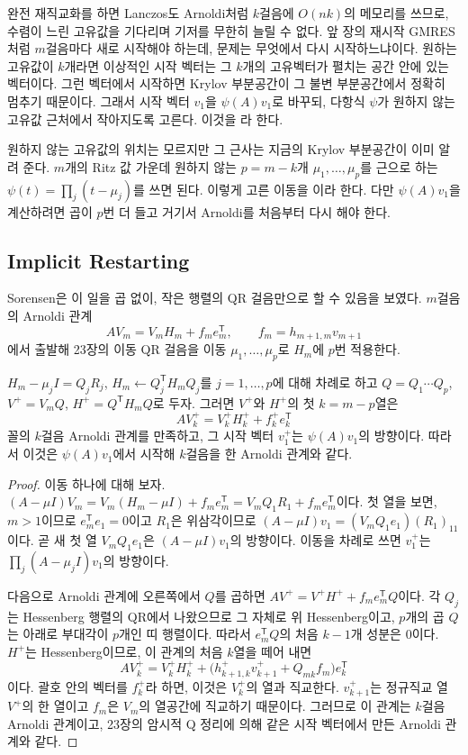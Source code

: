 완전 재직교화를 하면 Lanczos도 Arnoldi처럼 $k$걸음에 $O(nk)$의 메모리를 쓰므로, 수렴이 느린 고유값을 기다리며 기저를 무한히 늘릴 수 없다. 앞 장의 재시작 GMRES처럼 $m$걸음마다 새로 시작해야 하는데, 문제는 무엇에서 다시 시작하느냐이다. 원하는 고유값이 $k$개라면 이상적인 시작 벡터는 그 $k$개의 고유벡터가 펼치는 공간 안에 있는 벡터이다. 그런 벡터에서 시작하면 Krylov 부분공간이 그 불변 부분공간에서 정확히 멈추기 때문이다. 그래서 시작 벡터 $v_1$을 $\psi(A)v_1$로 바꾸되, 다항식 $\psi$가 원하지 않는 고유값 근처에서 작아지도록 고른다. 이것을 라 한다.

원하지 않는 고유값의 위치는 모르지만 그 근사는 지금의 Krylov 부분공간이 이미 알려 준다. $m$개의 Ritz 값 가운데 원하지 않는 $p=m-k$개 $\mu_1,\dots,\mu_p$를 근으로 하는 $\psi(t)=\prod_j(t-\mu_j)$를 쓰면 된다. 이렇게 고른 이동을 이라 한다. 다만 $\psi(A)v_1$을 계산하려면 곱이 $p$번 더 들고 거기서 Arnoldi를 처음부터 다시 해야 한다.

\subsection{Implicit Restarting}

Sorensen은 이 일을 곱 없이, 작은 행렬의 QR 걸음만으로 할 수 있음을 보였다\cite{sorensen1992implicit}. $m$걸음의 Arnoldi 관계
\[
AV_m=V_mH_m+f_me_m^{\mathsf T},\qquad f_m=h_{m+1,m}v_{m+1}
\]
에서 출발해 23장의 이동 QR 걸음을 이동 $\mu_1,\dots,\mu_p$로 $H_m$에 $p$번 적용한다.

\begin{theorem}
\label{thm:implicit-restart}
$H_m-\mu_jI=Q_jR_j$, $H_m\gets Q_j^{\mathsf T}H_mQ_j$를 $j=1,\dots,p$에 대해 차례로 하고 $Q=Q_1\cdots Q_p$, $V^+=V_mQ$, $H^+=Q^{\mathsf T}H_mQ$로 두자. 그러면 $V^+$와 $H^+$의 첫 $k=m-p$열은
\[
AV_k^+=V_k^+H_k^++f_k^+e_k^{\mathsf T}
\]
꼴의 $k$걸음 Arnoldi 관계를 만족하고, 그 시작 벡터 $v_1^+$는 $\psi(A)v_1$의 방향이다. 따라서 이것은 $\psi(A)v_1$에서 시작해 $k$걸음을 한 Arnoldi 관계와 같다.
\end{theorem}

\begin{proof}
이동 하나에 대해 보자. $(A-\mu I)V_m=V_m(H_m-\mu I)+f_me_m^{\mathsf T}=V_mQ_1R_1+f_me_m^{\mathsf T}$이다. 첫 열을 보면, $m>1$이므로 $e_m^{\mathsf T}e_1=0$이고 $R_1$은 위삼각이므로 $(A-\mu I)v_1=(V_mQ_1e_1)(R_1)_{11}$이다. 곧 새 첫 열 $V_mQ_1e_1$은 $(A-\mu I)v_1$의 방향이다. 이동을 차례로 쓰면 $v_1^+$는 $\prod_j(A-\mu_jI)v_1$의 방향이다.

다음으로 Arnoldi 관계에 오른쪽에서 $Q$를 곱하면 $AV^+=V^+H^++f_me_m^{\mathsf T}Q$이다. 각 $Q_j$는 Hessenberg 행렬의 QR에서 나왔으므로 그 자체로 위 Hessenberg이고, $p$개의 곱 $Q$는 아래로 부대각이 $p$개인 띠 행렬이다. 따라서 $e_m^{\mathsf T}Q$의 처음 $k-1$개 성분은 $0$이다. $H^+$는 Hessenberg이므로, 이 관계의 처음 $k$열을 떼어 내면
\[
AV_k^+=V_k^+H_k^++\bigl(h^+_{k+1,k}v_{k+1}^++Q_{mk}f_m\bigr)e_k^{\mathsf T}
\]
이다. 괄호 안의 벡터를 $f_k^+$라 하면, 이것은 $V_k^+$의 열과 직교한다. $v_{k+1}^+$는 정규직교 열 $V^+$의 한 열이고 $f_m$은 $V_m$의 열공간에 직교하기 때문이다. 그러므로 이 관계는 $k$걸음 Arnoldi 관계이고, 23장의 암시적 Q 정리에 의해 같은 시작 벡터에서 만든 Arnoldi 관계와 같다.
\end{proof}

